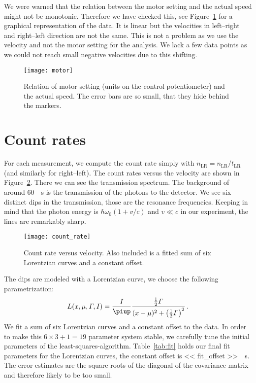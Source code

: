 \documentclass[11pt, english, fleqn, DIV=15, headinclude, BCOR=2cm]{scrreprt}
\newcommand\tLR{t_\text{LR}}
\newcommand\nLR{n_\text{LR}}
\newcommand\rateLR{\dot n_\text{LR}}
\begin{document}
We were warned that the relation between the motor setting and the actual speed
might not be monotonic. Therefore we have checked this, see
Figure~\ref{fig:motor} for a graphical representation of the data. It is linear
but the velocities in left--right and right--left direction are not the same.
This is not a problem as we use the velocity and not the motor setting for the
analysis. We lack a few data points as we could not reach small negative
velocities due to this shifting.

\begin{figure}
    \centering
    \texttt{[image: motor]}
    \caption{%
        Relation of motor setting (units on the control potentiometer) and the
        actual speed. The error bars are so small, that they hide behind the
        markers.
    }
    \label{fig:motor}
\end{figure}

\section{Count rates}

For each measurement, we compute the count rate simply with $\rateLR = \nLR /
\tLR$ (and similarly for right--left). The count rates versus the velocity are
shown in Figure~\ref{fig:count_rate}. There we can see the transmission
spectrum. The background of around \SI{60}{\per\second} is the transmission of
the photons to the detector. We see six distinct dips in the transmission,
those are the resonance frequencies. Keeping in mind that the photon energy is
$\hbar \omega_0 (1 + v/c)$ and $v \ll c$ in our experiment, the lines are
remarkably sharp.

\begin{figure}
    \centering
    \texttt{[image: count\_rate]}
    \caption{%
        Count rate versus velocity. Also included is a fitted sum of six
        Lorentzian curves and a constant offset.
    }
    \label{fig:count_rate}
\end{figure}

The dips are modeled with a Lorentzian curve, we choose the following
parametrization:
\[
    L(x, \mu, \Gamma, I) = \frac I \piup \frac{\frac12 \Gamma}{(x - \mu)^2 +
    \del{\frac 12 \Gamma}^2} \,.
\]
We fit a sum of six Lorentzian curves and a constant offset to the data. In
order to make this $6 \times 3 + 1 = 19$ parameter system stable, we carefully
tune the initial parameters of the least-squares-algorithm. Table~\ref{tab:fit}
holds our final fit parameters for the Lorentzian curves, the constant offset
is \SI{<< fit_offset >>}{\per\second}. The error estimates are the square roots
of the diagonal of the covariance matrix and therefore likely to be too small.
\end{document}
